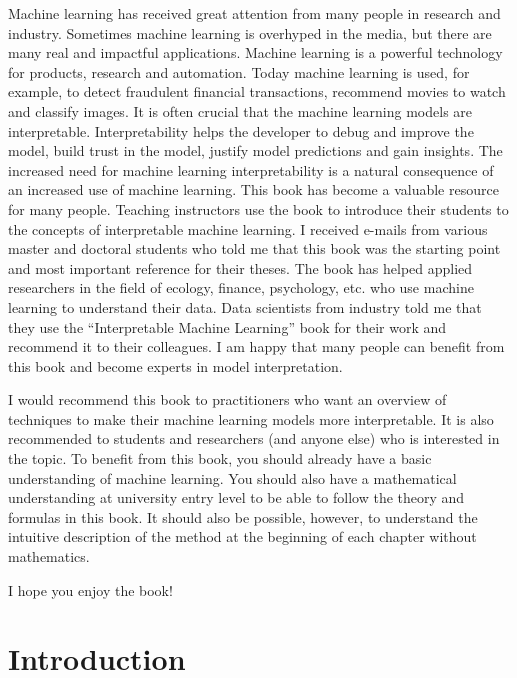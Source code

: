\documentclass[12pt,]{krantz}
\begin{document}
Machine learning has received great attention from many people in
research and industry. Sometimes machine learning is overhyped in the
media, but there are many real and impactful applications. Machine
learning is a powerful technology for products, research and automation.
Today machine learning is used, for example, to detect fraudulent
financial transactions, recommend movies to watch and classify images.
It is often crucial that the machine learning models are interpretable.
Interpretability helps the developer to debug and improve the model,
build trust in the model, justify model predictions and gain insights.
The increased need for machine learning interpretability is a natural
consequence of an increased use of machine learning. This book has
become a valuable resource for many people. Teaching instructors use the
book to introduce their students to the concepts of interpretable
machine learning. I received e-mails from various master and doctoral
students who told me that this book was the starting point and most
important reference for their theses. The book has helped applied
researchers in the field of ecology, finance, psychology, etc. who use
machine learning to understand their data. Data scientists from industry
told me that they use the ``Interpretable Machine Learning'' book for
their work and recommend it to their colleagues. I am happy that many
people can benefit from this book and become experts in model
interpretation.

I would recommend this book to practitioners who want an overview of
techniques to make their machine learning models more interpretable. It
is also recommended to students and researchers (and anyone else) who is
interested in the topic. To benefit from this book, you should already
have a basic understanding of machine learning. You should also have a
mathematical understanding at university entry level to be able to
follow the theory and formulas in this book. It should also be possible,
however, to understand the intuitive description of the method at the
beginning of each chapter without mathematics.

I hope you enjoy the book!

\mainmatter

\chapter{Introduction}\label{intro}
\end{document}
